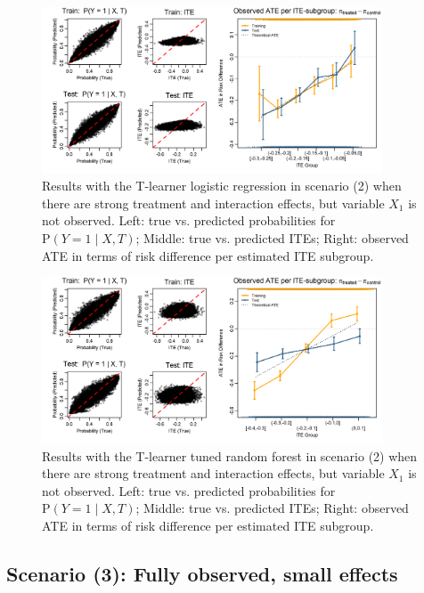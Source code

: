 \begin{figure}[htbp]
\centering
\includegraphics[width=0.9\textwidth]{img/results_ITE_simulation/unobserved_interaction_glm_tlearner.png}
\caption{Results with the T-learner logistic regression in scenario (2) when there are strong treatment and interaction effects, but variable $X_1$ is not observed. Left: true vs. predicted probabilities for $\text{P}(Y=1 \mid X, T)$; Middle: true vs. predicted ITEs; Right: observed ATE in terms of risk difference per estimated ITE subgroup.}
\label{fig:unobserved_interaction_glm_tlearner}
\end{figure}



\begin{figure}[htbp]
\centering
\includegraphics[width=0.9\textwidth]{img/results_ITE_simulation/unobserved_interaction_tuned_rf_tlearner.png}
\caption{Results with the T-learner tuned random forest in scenario (2) when there are strong treatment and interaction effects, but variable $X_1$ is not observed. Left: true vs. predicted probabilities for $\text{P}(Y=1 \mid X, T)$; Middle: true vs. predicted ITEs; Right: observed ATE in terms of risk difference per estimated ITE subgroup.}
\label{fig:unobserved_interaction_tuned_rf_tlearner}
\end{figure}


\clearpage

\subsection{Scenario (3): Fully observed, small effects}

